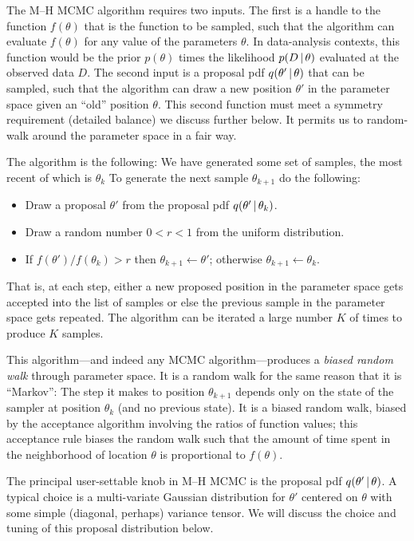 \documentclass[12pt,twoside,pdftex]{article}
\newcommand{\data}{D}
\newcommand{\pars}{\theta}
\begin{document}
The M--H MCMC algorithm requires two inputs.
The first is a handle to the function $f(\pars)$ that is the function to be sampled,
  such that the algorithm can evaluate $f(\pars)$ for any value of the parameters $\pars$.
In data-analysis contexts,
  this function would be the prior $p(\pars)$ times the likelihood $p(\data\given\pars)$
  evaluated at the observed data $\data$.
The second input is a proposal pdf $q(\pars'\given\pars)$ that can be sampled,
  such that the algorithm can draw a new position $\pars'$ in the parameter space
  given an ``old'' position $\pars$.
This second function must meet a symmetry requirement (detailed
  balance) we discuss further below.
It permits us to random-walk around the parameter space in a fair way.

The algorithm is the following:
We have generated some set of samples, the most recent of which is $\pars_k$
To generate the next sample $\pars_{k+1}$ do the following:
\begin{itemize}
\item Draw a proposal $\pars'$ from the proposal pdf $q(\pars'\given\pars_k)$.
\item Draw a random number $0<r<1$ from the uniform distribution.
\item If $f(\pars') / f(\pars_k) > r$ then $\pars_{k+1} \leftarrow \pars'$;
      otherwise $\pars_{k+1} \leftarrow \pars_k$.
\end{itemize}
That is, at each step, either a new proposed position in the parameter
  space gets accepted into the list of samples or else the previous sample
  in the parameter space gets repeated.
The algorithm can be iterated a large number $K$ of times to produce $K$ samples.

This algorithm---and indeed any MCMC algorithm---produces a
  \emph{biased random walk} through parameter space.
It is a random walk for the same reason that it is ``Markov'':
The step it makes to position $\pars_{k+1}$ depends only on the state
  of the sampler at position $\pars_k$ (and no previous state).
It is a biased random walk, biased by the acceptance algorithm
  involving the ratios of function values; this acceptance rule biases
  the random walk such that the amount of time spent in the neighborhood
  of location $\pars$ is proportional to $f(\pars)$.

The principal user-settable knob in M--H MCMC is the proposal
  pdf $q(\pars'\given\pars)$.
A typical choice is a multi-variate Gaussian distribution for $\pars'$
  centered on $\pars$ with some simple (diagonal, perhaps) variance
  tensor.
We will discuss the choice and tuning of this proposal distribution
  below.
\end{document}
